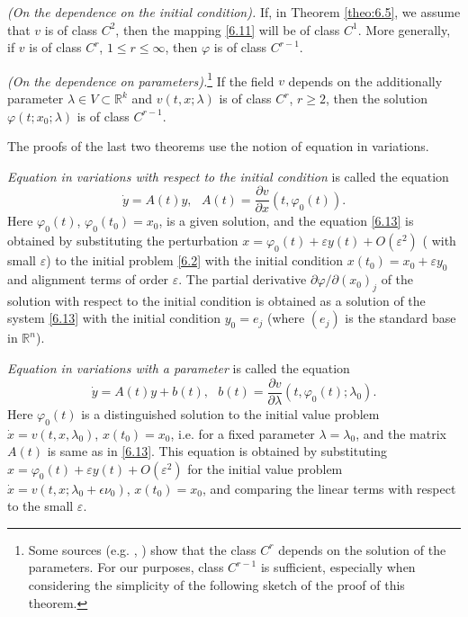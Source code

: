 \begin{theorem}\label{theo:6.7}
	\emph{(On the dependence on the initial condition).}
	If, in Theorem \ref{theo:6.5}, we assume that $v$ is of class $C^2$, then the mapping \eqref{6.11} will be of class $C^1$. More generally, if $v$ is of class $C^r$, $1 \leq r \leq \infty$, then $\varphi $ is of class $C^{r-1}$.
\end{theorem}

\begin{theorem}\label{theo:6.8}
	\emph{(On the dependence on parameters).}\footnote{Some sources (e.g. \cite{Hart}, \cite{Hale}) show that the class $C^r$ depends on the solution of the parameters. For our purposes, class $C^{r-1}$ is sufficient, especially when considering the simplicity of the following sketch of the proof of this theorem.}
	If the field $v$ depends on the additionally parameter $\lambda \in V\subset \mathbb{R}^{k}$ and $v(t,x;\lambda )$ is of class $C^r$, $r \geq 2$, then the solution $\varphi (t;x_{0};\lambda )$ is of class $C^{r-1}$.
\end{theorem}

The proofs of the last two theorems use the notion of equation in variations.

\emph{Equation in variations with respect to the initial condition} is called the equation
\begin{equation}
\label{6.13}
\dot{y}=A(t)y,\text{ \ \ }A(t)=\frac{\partial v}{\partial x}(t,\varphi
_{0}(t)).
\end{equation}
Here $\varphi _{0}(t)$, $\varphi _{0}(t_{0})=x_{0}$, is a given solution, and the equation \eqref{6.13} is obtained by substituting the perturbation $x= \varphi_{0} (t) + \varepsilon y(t) + O(\varepsilon ^{2})$ ( with small $\varepsilon$) to the initial problem \eqref{6.2} with the initial condition $x(t_{0})=x_{0}+\varepsilon y_{0}$ and alignment terms of order $\varepsilon$.	 The partial derivative $\partial \varphi /\partial (x_{0})_{j}$ of the solution with respect to the initial condition is obtained as a solution of the system \eqref{6.13} with the initial condition $y_{0}=e_{j}$ (where $(e_{j})$ is the standard base in $\mathbb{R}^{n}$).

\emph{Equation in variations with a parameter} is called the equation
\begin{equation}
\label{6.14}
\dot{y}=A(t)y+b(t),\text{ \ \ }b(t)=\frac{\partial v}{\partial \lambda }%
(t,\varphi _{0}(t);\lambda _{0}).
\end{equation}
Here $\varphi _{0}(t)$ is a distinguished solution to the initial value problem $\dot{x}=v(t,x,\lambda _{0})$, $x(t_{0}) = x_{0}$, i.e. for a fixed parameter $\lambda =\lambda _{0}$, and the matrix $A(t)$ is same as in \eqref{6.13}. This equation is obtained by substituting $x=\varphi _{0}(t)+\varepsilon y(t)+O(\varepsilon ^{2})$ for the initial value problem $\dot{x}=v(t,x;\lambda _{0}+\epsilon \nu _{0})$, $x(t_{0})=x_{0}$, and comparing the linear terms with respect to the small $\varepsilon$.

